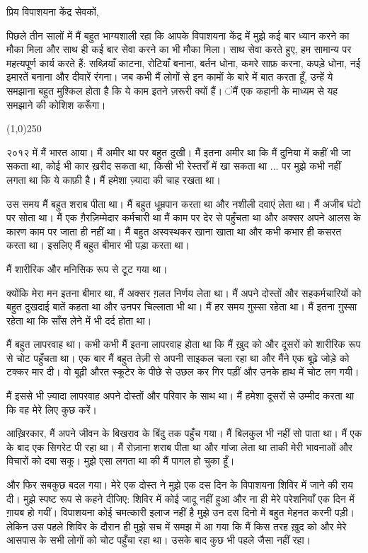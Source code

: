 \documentclass{article}
\begin{document}
प्रिय विपाशयना केंद्र सेवकों,

पिछले तीन सालों में मैं बहुत भाग्यशाली रहा कि आपके विपाशयना केंद्र में मुझे कई बार ध्यान करने का मौका मिला और साथ
ही कई बार सेवा करने का भी मौका मिला। साथ सेवा करते हुए, हम सामान्य पर महत्यपूर्ण कार्य करते हैं: सब्ज़ियाँ काटना, रोटियाँ
बनाना, बर्तन धोना, कमरे साफ़ करना, कपड़े धोना, नई इमारतें बनाना और दीवारें रंगना। जब कभी मैं
लोगों से इन कामों के बारे में बात करता हूँ, उन्हें ये समझाना बहुत मुश्किल होता है कि ये काम इतने ज़रूरी क्यों हैं।
ंमैं एक कहानी के माध्यम से यह समझाने की कोशिश करूँगा।


\begin{center}
\line(1,0){250}
\end{center}

२०१२ में मैं भारत आया। मैं अमीर था पर बहुत दुखी। मैं इतना अमीर था कि मैं दुनिया में कहीं भी जा सकता
था, कोई भी कार ख़रीद सकता था, किसी भी रेस्तराँ में खा सकता था ... पर मुझे कभी
नहीं लगता था कि ये काफ़ी है। मैं हमेशा ज़्यादा की चाह रखता था।

उस समय मैं बहुत शराब पीता था। मैं बहुत धूम्रपान करता था और नशीली दवाएं लेता था। मैं अजीब घंटो पर सोता
था। मैं एक ग़ैरज़िम्मेदार कर्मचारी था \textemdash  मैं काम पर देर से पहुँचता था और अक्सर अपने आलस के कारण
काम पर जाता ही नहीं था। मैं बहुत अस्वस्थकर खाना खाता था और कभी कभार ही कसरत करता था। इसलिए मैं
बहुत बीमार भी पड़ा करता था।

मैं शारीरिक और मनिसिक रूप से टूट गया था।

क्योंकि मेरा मन इतना बीमार था, मैं अक्सर ग़लत निर्णय लेता था। मैं अपने दोस्तों और सहकर्मचारियों को बहुत
दुखदाई बातें कहता था और उनपर चिल्लाता भी था। मैं हर समय ग़ुस्सा रहेता था। मैं इतना ग़ुस्सा रहेता था
कि साँस लेने में भी दर्द होता था।

मैं बहुत लापरवाह था। कभी कभी मैं इतना लापरवाह होता था कि मैं ख़ुद को और दूसरों को शारीरिक रूप से
चोट पहुँचता था। एक बार मैं बहुत तेज़ी से अपनी साइकल चला रहा था और मैंने एक बूढ़े जोड़े को टक्कर मार दी। वो बूढ़ी औरत स्कूटेर के पीछे से उछल कर गिर पड़ीं और उनके हाथ में चोट लग गयी।

मैं इससे भी ज़्यादा लापरवाह अपने दोस्तों और
परिवार के साथ था। मैं हमेशा दूसरों से उम्मीद करता था कि वह मेरे लिए कुछ करें।

आख़िरकार, मैं अपने जीवन के बिखराव के बिंदु तक पहुँच गया। मैं बिलकुल भी नहीं सो पाता था। मैं एक के
बाद एक सिगरेट पी रहा था। मैं रोज़ाना शराब पीता था और गांजा लेता था ताकी मेरी भावनाओं और विचारों
को दबा सकू। मुझे एसा लगता था की मैं पागल हो चुका हूँ।

और फिर सबकुछ बदल गया। मेरे एक दोस्त ने मुझे एक दस दिन के विपाशयना शिविर में जाने की राय दी। मुझे स्पष्ट
रूप से कहने दीजिए: शिविर में कोई जादू नहीं हुआ और ना ही मेरे परेशनियाँ एक दिन में ग़ायब हो गयीं।
विपाशयना कोई चमत्कारी इलाज नहीं है \textemdash  मुझे उन दस दिनो में बहुत मेहनत करनी पड़ी। लेकिन उस पहले
शिविर के दौरान ही मुझे सच में समझ में आ गया कि मैं किस तरह ख़ुद को और मेरे आसपास के सभी लोगों को चोट
पहुँचा रहा था। उसके बाद कुछ भी पहले जैसा नहीं रहा।
\end{document}

